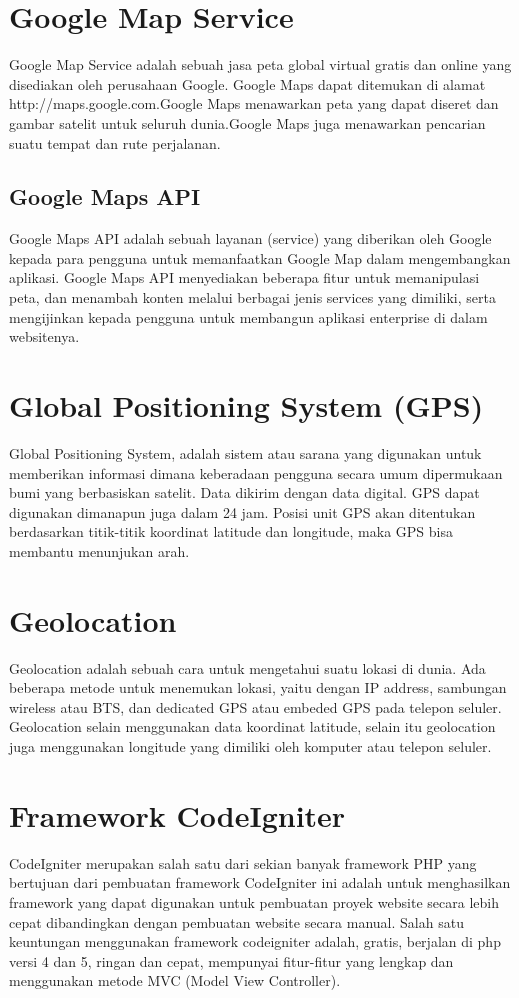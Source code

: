 \documentclass[12pt,a4paper]{article}
\begin{document}
\section {Google Map Service}
Google Map Service adalah sebuah jasa peta global virtual gratis dan online yang
disediakan oleh perusahaan Google. Google Maps dapat ditemukan di alamat
http://maps.google.com.Google Maps menawarkan peta yang dapat diseret dan gambar
satelit untuk seluruh dunia.Google Maps juga menawarkan pencarian suatu tempat dan
rute perjalanan.
\subsection {Google Maps API }
Google Maps API adalah sebuah layanan (service) yang diberikan oleh Google
kepada para pengguna untuk memanfaatkan Google Map dalam mengembangkan
aplikasi. Google Maps API menyediakan beberapa fitur untuk memanipulasi peta, dan
menambah konten melalui berbagai jenis services yang dimiliki, serta mengijinkan
kepada pengguna untuk membangun aplikasi enterprise di dalam websitenya.


\section{Global Positioning System (GPS)}
Global Positioning System, adalah sistem atau sarana yang digunakan untuk memberikan informasi dimana keberadaan pengguna secara umum dipermukaan bumi yang berbasiskan satelit. Data dikirim dengan data digital. GPS dapat digunakan dimanapun juga dalam 24 jam. Posisi unit GPS akan ditentukan berdasarkan titik-titik koordinat latitude dan longitude, maka GPS bisa membantu menunjukan arah. 


\section{Geolocation}
Geolocation adalah sebuah cara untuk mengetahui suatu lokasi di dunia. Ada beberapa metode untuk menemukan lokasi, yaitu dengan IP address, sambungan wireless atau BTS, dan dedicated GPS atau embeded GPS pada telepon seluler. Geolocation selain menggunakan data koordinat latitude, selain itu geolocation juga menggunakan longitude yang dimiliki oleh komputer atau telepon seluler.


\section{Framework CodeIgniter}
CodeIgniter merupakan salah satu dari sekian banyak framework PHP yang  bertujuan dari pembuatan framework CodeIgniter ini adalah untuk menghasilkan framework  yang dapat digunakan untuk pembuatan proyek website secara lebih cepat dibandingkan dengan pembuatan website secara manual.
Salah satu keuntungan menggunakan framework codeigniter adalah, gratis, berjalan di php versi 4 dan 5, ringan dan cepat, mempunyai fitur-fitur yang lengkap dan menggunakan metode MVC (Model View Controller).
\end{document}
